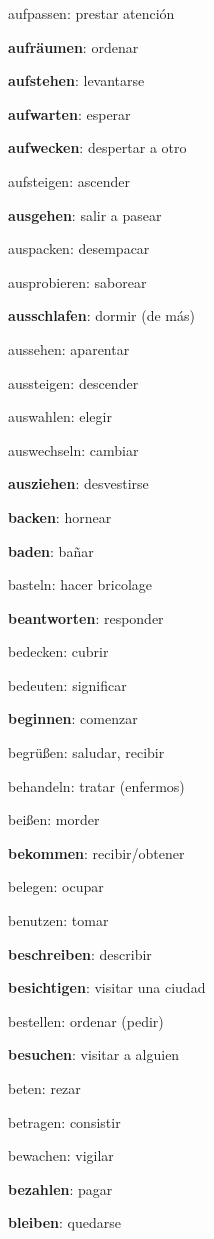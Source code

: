 \begin{multicols}{2}
\begin{myitemize}
\item aufpassen: prestar atención
\item \textbf{aufräumen}: ordenar
\item \textbf{aufstehen}: levantarse
\item \textbf{aufwarten}: esperar
\item \textbf{aufwecken}: despertar a otro
\item aufsteigen: ascender
\item \textbf{ausgehen}: salir a pasear
\item auspacken: desempacar
\item ausprobieren: saborear
\item \textbf{ausschlafen}: dormir (de más)
\item aussehen: aparentar
\item aussteigen: descender
\item auswahlen: elegir
\item auswechseln: cambiar
\item \textbf{ausziehen}: desvestirse
\item \textbf{backen}: hornear
\item \textbf{baden}: bañar
\item basteln: hacer bricolage
\item \textbf{beantworten}: responder
\item bedecken: cubrir
\item bedeuten: significar
\item \textbf{beginnen}: comenzar
\item begrüßen: saludar, recibir
\item behandeln: tratar (enfermos)
\item beißen: morder
\item \textbf{bekommen}: recibir/obtener
\item belegen: ocupar
\item benutzen: tomar
\item \textbf{beschreiben}: describir
\item \textbf{besichtigen}: visitar una ciudad
\item bestellen: ordenar (pedir)
\item \textbf{besuchen}: visitar a alguien
\item beten: rezar
\item betragen: consistir
\item bewachen: vigilar
\item \textbf{bezahlen}: pagar
\item \textbf{bleiben}: quedarse

\end{myitemize}
\end{multicols}
